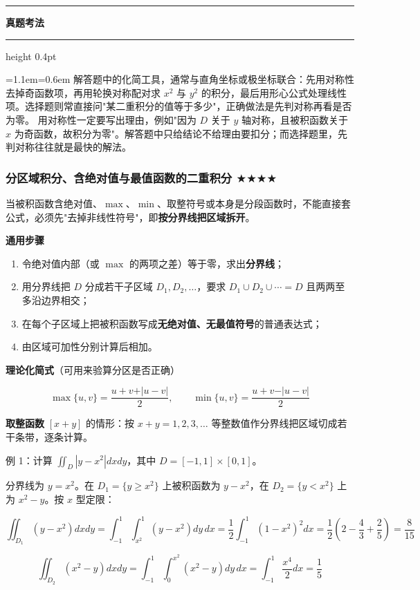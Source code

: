 \documentclass[11pt,openany,UTF8]{ctexbook}
\newcommand{\callouthead}[2]{%
  \par\addvspace{7pt}\noindent
  {\color{#1}\rule[-0.15em]{3pt}{1.05em}}\hspace{0.5em}%
  {\bfseries\color{#1}#2}\par\nobreak\vspace{-0.35em}%
  {\color{rulesep}\hrule height 0.4pt}\nobreak\vspace{0.45em}%
  \begingroup\small\setlength{\parindent}{0pt}%
  \leftskip=1.1em\rightskip=0.6em\noindent\ignorespaces}
\newcommand{\calloutend}{\par\endgroup\addvspace{7pt}}
\newenvironment{callexam}[1]{\callouthead{exambar}{#1}}{\calloutend}
\begin{document}
\begin{callexam}{真题考法}
解答题中的化简工具，通常与直角坐标或极坐标联合：先用对称性去掉奇函数项，再用轮换对称配对求 $x^{2}$ 与 $y^{2}$ 的积分，最后用形心公式处理线性项。选择题则常直接问"某二重积分的值等于多少"，正确做法是先判对称再看是否为零。 用对称性一定要写出理由，例如"因为 $D$ 关于 $y$ 轴对称，且被积函数关于 $x$ 为奇函数，故积分为零"。解答题中只给结论不给理由要扣分；而选择题里，先判对称往往就是最快的解法。

\end{callexam}

\subsubsection{分区域积分、含绝对值与最值函数的二重积分 $\bigstar$$\bigstar$$\bigstar$$\bigstar$}

当被积函数含绝对值、$\max$、$\min$、取整符号或本身是分段函数时，不能直接套公式，必须先"去掉非线性符号"，即\textbf{按分界线把区域拆开}。

\textbf{通用步骤}

\begin{enumerate}
\item 令绝对值内部（或 $\max$ 的两项之差）等于零，求出\textbf{分界线}；
\item 用分界线把 $D$ 分成若干子区域 $D_1,D_2,\dots$，要求 $D_1\cup D_2\cup\cdots=D$ 且两两至多沿边界相交；
\item 在每个子区域上把被积函数写成\textbf{无绝对值、无最值符号}的普通表达式；
\item 由区域可加性分别计算后相加。
\end{enumerate}
\textbf{理论化简式}（可用来验算分区是否正确）

\[\max\{u,v\}=\frac{u+v+\vert u-v\vert}{2},\qquad \min\{u,v\}=\frac{u+v-\vert u-v\vert}{2}\]

\textbf{取整函数} $[x+y]$ 的情形：按 $x+y=1,2,3,\dots$ 等整数值作分界线把区域切成若干条带，逐条计算。

例 1：计算 $\displaystyle\iint_{D}\left\vert y-x^{2}\right\vert dxdy$，其中 $D=[-1,1]\times[0,1]$。

分界线为 $y=x^{2}$。在 $D_1=\{y\ge x^{2}\}$ 上被积函数为 $y-x^{2}$，在 $D_2=\{y<x^{2}\}$ 上为 $x^{2}-y$。按 $x$ 型定限：

\[\iint_{D_1}\left(y-x^{2}\right)dxdy=\int_{-1}^{1}\int_{x^{2}}^{1}\left(y-x^{2}\right)dy\,dx=\frac12\int_{-1}^{1}\left(1-x^{2}\right)^{2}dx=\frac12\left(2-\frac43+\frac25\right)=\frac{8}{15}\]

\[\iint_{D_2}\left(x^{2}-y\right)dxdy=\int_{-1}^{1}\int_{0}^{x^{2}}\left(x^{2}-y\right)dy\,dx=\int_{-1}^{1}\frac{x^{4}}{2}dx=\frac15\]
\end{document}
